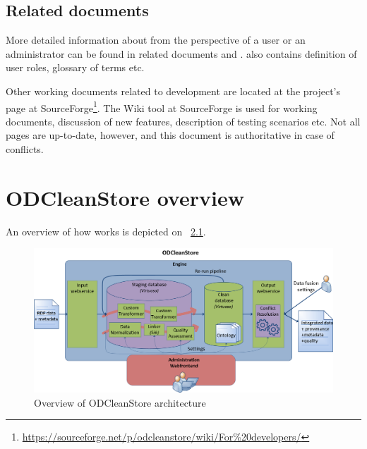 \section{Related documents}
More detailed information about \odcs from the perspective of a user or an administrator can be found in related documents  and .  also contains definition of user roles, glossary of terms etc.

Other working documents related to development are located at the project's page at SourceForge\footnote{\url{https://sourceforge.net/p/odcleanstore/wiki/For\%20developers/}}. The Wiki tool at SourceForge is used for working documents, discussion of new features, description of testing scenarios etc. Not all pages are up-to-date, however, and this document is authoritative in case of conflicts.



\chapter{ODCleanStore overview} 
An overview of how \odcs works is depicted on \figurename~\ref{fig:odcsInternal}.

\begin{figure}[htb]
    \centering
    \includegraphics[width=\textwidth]{images/odcs-internal.png}
    \caption{Overview of ODCleanStore architecture}
	\label{fig:odcsInternal}
\end{figure}

